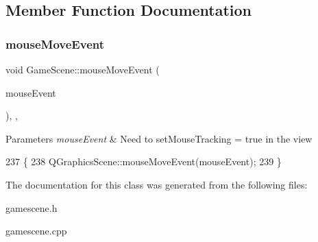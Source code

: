 \subsection{Member Function Documentation}
\mbox{\label{class_game_scene_a60e084f3ade89e765a5ff86f2c0d7bf1}} 
\subsubsection{\texorpdfstring{mouse\+Move\+Event}{mouseMoveEvent}}
{\footnotesize\ttfamily void Game\+Scene\+::mouse\+Move\+Event (\begin{DoxyParamCaption}\item[{Q\+Graphics\+Scene\+Mouse\+Event $\ast$}]{mouse\+Event }\end{DoxyParamCaption})\hspace{0.3cm}{\ttfamily [override]}, {\ttfamily [protected]}, {\ttfamily [slot]}}


\begin{DoxyParams}{Parameters}
{\em mouse\+Event} & Need to set\+Mouse\+Tracking = true in the view \\
\hline
\end{DoxyParams}

\begin{DoxyCode}
237                                                                    \{
238     QGraphicsScene::mouseMoveEvent(mouseEvent);
239 \}
\end{DoxyCode}


The documentation for this class was generated from the following files\+:\begin{DoxyCompactItemize}
\item 
gamescene.\+h\item 
gamescene.\+cpp\end{DoxyCompactItemize}
